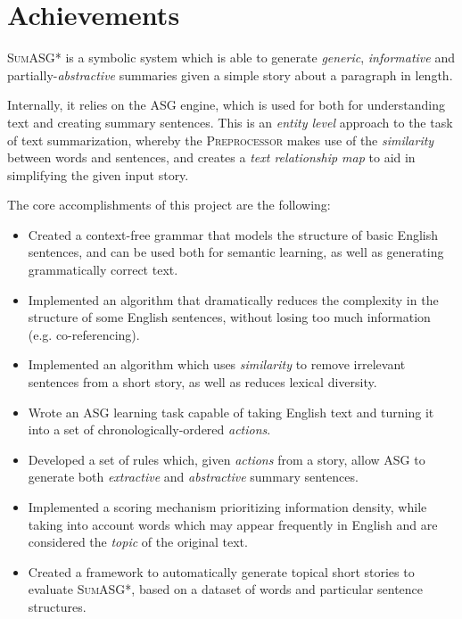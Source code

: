 \label{chapter:conclusion}

\section{Achievements}

\textsc{SumASG*} is a symbolic system which is able to generate \textit{generic}, \textit{informative} and partially-\textit{abstractive} summaries given a simple story about a paragraph in length.

Internally, it relies on the ASG engine, which is used for both for understanding text and creating summary sentences. This is an \textit{entity level} approach to the task of text summarization, whereby the \textsc{Preprocessor} makes use of the \textit{similarity} between words and sentences, and creates a \textit{text relationship map} to aid in simplifying the given input story.

The core accomplishments of this project are the following:

\begin{itemize}
\item Created a context-free grammar that models the structure of basic English sentences, and can be used both for semantic learning, as well as generating grammatically correct text.
\item Implemented an algorithm that dramatically reduces the complexity in the structure of some English sentences, without losing too much information (e.g. co-referencing).
\item Implemented an algorithm which uses \textit{similarity} to remove irrelevant sentences from a short story, as well as reduces lexical diversity.
\item Wrote an ASG learning task capable of taking English text and turning it into a set of chronologically-ordered \textit{actions}.
\item Developed a set of rules which, given \textit{actions} from a story, allow ASG to generate both \textit{extractive} and \textit{abstractive} summary sentences.
\item Implemented a scoring mechanism prioritizing information density, while taking into account words which may appear frequently in English and are considered the \textit{topic} of the original text.
\item Created a framework to automatically generate topical short stories to evaluate \textsc{SumASG*}, based on a dataset of words and particular sentence structures.
\end{itemize}

